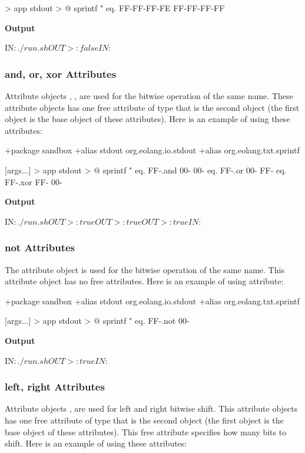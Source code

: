 \documentclass[12pt]{book}
\begin{document}
{\begin{ffcode}
[args...] > app
stdout > @
  sprintf
    "%
    eq.
     FF-FF-FF-FE
     FF-FF-FF-FF
\end{ffcode}
\textbf{Output}
\begin{ffcode}
IN$: ./run.sh
OUT>: false
IN$: 
\end{ffcode}

\subsubsection{and, or, xor Attributes}
Attribute objects , ,  are used for the bitwise operation of the same name. These attribute objects has one free attribute of type  that is the second object (the first object is the base object of these attributes). Here is an example of using these attributes:
\begin{ffcode}
+package sandbox
+alias stdout org.eolang.io.stdout
+alias org.eolang.txt.sprintf

[args...] > app
  stdout > @
    sprintf
      "%
      eq.
        FF-.and 00-
        00-
      eq.
        FF-.or 00-
        FF-
      eq.
        FF-.xor FF-
        00-
\end{ffcode}
\textbf{Output}
\begin{ffcode}
IN$: ./run.sh
OUT>: true
OUT>: true
OUT>: true
IN$: 
\end{ffcode}

\subsubsection{not Attributes}
The  attribute object is used for the bitwise operation of the same name. This attribute object has no free attributes. Here is an example of using  attribute:
\begin{ffcode}
+package sandbox
+alias stdout org.eolang.io.stdout
+alias org.eolang.txt.sprintf
    
[args...] > app
  stdout > @
    sprintf
      "%
      eq.
        FF-.not
        00-
\end{ffcode}
\textbf{Output}
\begin{ffcode}
IN$: ./run.sh
OUT>: true
IN$: 
\end{ffcode}

\subsubsection{left, right Attributes}
Attribute objects ,  are used for left and right bitwise shift. This attribute objects has one free attribute of type  that is the second object (the first object is the base object of these attributes). This free attribute specifies how many bits to shift. Here is an example of using these attributes:

}
\end{document}
